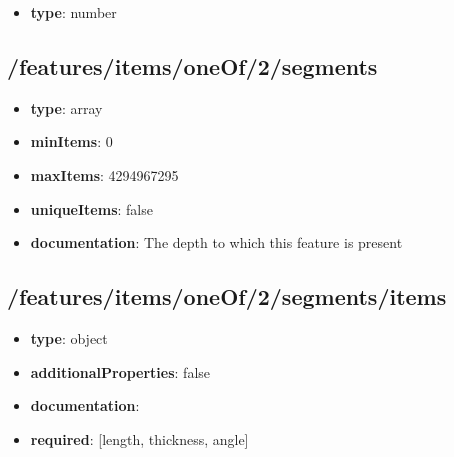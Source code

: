 \begin{itemize}\item {\bf type}: number
\end{itemize}\subsection{/features/items/oneOf/2/segments}
\begin{itemize}\item {\bf type}: array
\item {\bf minItems}: 0
\item {\bf maxItems}: 4294967295
\item {\bf uniqueItems}: false
\item {\bf documentation}: The depth to which this feature is present
\end{itemize}\subsection{/features/items/oneOf/2/segments/items}
\begin{itemize}\item {\bf type}: object
\item {\bf additionalProperties}: false
\item {\bf documentation}: 
\item {\bf required}: [length, thickness, angle]\end{itemize}
